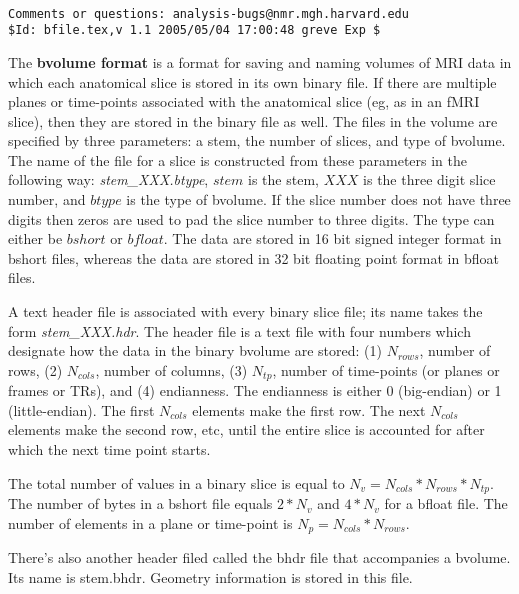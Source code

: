 \documentclass[10pt]{article}
\begin{document}
\begin{Large}
 \\
\end{Large}

\noindent 
\begin{verbatim}
Comments or questions: analysis-bugs@nmr.mgh.harvard.edu
$Id: bfile.tex,v 1.1 2005/05/04 17:00:48 greve Exp $
\end{verbatim}

The {\bf bvolume format} is a format for saving and naming volumes of
MRI data in which each anatomical slice is stored in its own binary
file.  If there are multiple planes or time-points associated with the
anatomical slice (eg, as in an fMRI slice), then they are stored in
the binary file as well.  The files in the volume are specified by
three parameters: a stem, the number of slices, and type of bvolume.
The name of the file for a slice is constructed from these parameters
in the following way: {\em stem\_XXX.btype}, $stem$ is the stem, $XXX$
is the three digit slice number, and $btype$ is the type of bvolume.
If the slice number does not have three digits then zeros are used to
pad the slice number to three digits.  The type can either be $bshort$
or $bfloat$.  The data are stored in 16 bit signed integer format in
bshort files, whereas the data are stored in 32 bit floating point
format in bfloat files.

A text header file is associated with every binary slice file; its
name takes the form {\em stem\_XXX.hdr}.  The header file is a text
file with four numbers which designate how the data in the binary
bvolume are stored: (1) $N_{rows}$, number of rows, (2) $N_{cols}$,
number of columns, (3) $N_{tp}$, number of time-points (or planes or
frames or TRs), and (4) endianness.  The endianness is either 0
(big-endian) or 1 (little-endian).  The first $N_{cols}$ elements make
the first row.  The next $N_{cols}$ elements make the second row, etc,
until the entire slice is accounted for after which the next time
point starts.

The total number of values in a binary slice is equal to $N_v = N_{cols} *
N_{rows} * N_{tp}$.  The number of bytes in a bshort file equals
$2*N_v$ and $4*N_v$ for a bfloat file.  The number of elements in a
plane or time-point is $N_p = N_{cols} * N_{rows}$.  

There's also another header filed called the bhdr file that
accompanies a bvolume. Its name is stem.bhdr. Geometry information is
stored in this file.
\end{document}
